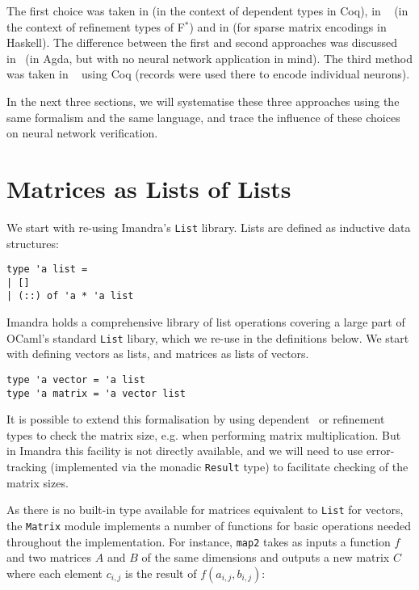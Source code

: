 \documentclass[runningheads]{llncs}
\begin{document}
The first choice was taken in \cite{heras_incidence_2011} (in the context of dependent types in Coq), in ~\cite{KokkeKKAA20} (in the context of refinement types of F$^*$) and in \cite{grant_sparse_1996} (for sparse matrix encodings in Haskell).  The difference between the first and second approaches was
discussed in~\cite{wood_vectors_2019} (in Agda, but with no neural network application in mind).
The third method was taken in ~\cite{MariaBLFGRG22} using Coq  (records were used there to encode individual neurons).

In the next three sections, we will systematise these three approaches using the same formalism and the same language,
and trace the influence of these choices on neural network verification.


\section{Matrices as Lists of Lists} \label{sec:lists}
We start with re-using  Imandra's  \lstinline{List} library. Lists are defined as inductive data structures:

\begin{lstlisting}
type 'a list =
| []
| (::) of 'a * 'a list
\end{lstlisting}


Imandra holds a comprehensive library of list operations covering a large part of OCaml's standard \lstinline{List} libary, which we re-use in the definitions below.
We start with defining vectors as lists, and matrices as lists of vectors. 

\begin{lstlisting}[frame=none, language=caml]
type 'a vector = 'a list
type 'a matrix = 'a vector list 
\end{lstlisting}

It is possible to extend this formalisation by using dependent~\cite{heras_incidence_2011} or refinement~\cite{KokkeKKAA20} types to check the matrix size, e.g. when performing matrix multiplication. But in Imandra this facility is not directly available, and we will need to use error-tracking (implemented via the monadic \lstinline{Result} type) to facilitate checking of the matrix sizes.

As there is no built-in type available for matrices equivalent to \lstinline{List} for vectors, the \lstinline{Matrix} module implements a number of functions for basic operations needed throughout the implementation. For instance, \lstinline{map2} takes as inputs a function $f$ and two matrices $A$ and $B$ of the same dimensions and outputs a new matrix $C$ where each element $c_{i,j}$ is the result of $f(a_{i, j}, b_{i, j})$:
\end{document}
